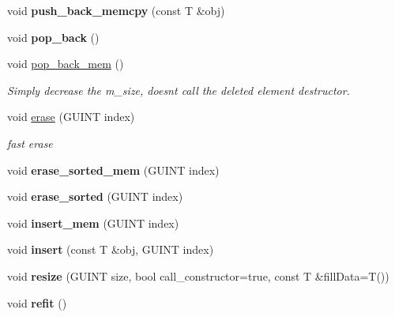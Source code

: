 \begin{DoxyCompactItemize}
\mbox{\label{classgim__array_a8ef553253e1a77ed4f3168ca2e4da225}} 
void {\bfseries push\+\_\+back\+\_\+memcpy} (const T \&obj)
\item 
\mbox{\label{classgim__array_aeebbf5deb27265451bf00db5ce57c5fc}} 
void {\bfseries pop\+\_\+back} ()
\item 
\mbox{\label{classgim__array_aa15906909f6f824e559864359096db63}} 
void \hyperlink{classgim__array_aa15906909f6f824e559864359096db63}{pop\+\_\+back\+\_\+mem} ()
\begin{DoxyCompactList}\small\item\em Simply decrease the m\+\_\+size, doesn\textquotesingle{}t call the deleted element destructor. \end{DoxyCompactList}\item 
\mbox{\label{classgim__array_a0de98d5b161c18568c7bc3a13e90df51}} 
void \hyperlink{classgim__array_a0de98d5b161c18568c7bc3a13e90df51}{erase} (G\+U\+I\+NT index)
\begin{DoxyCompactList}\small\item\em fast erase \end{DoxyCompactList}\item 
\mbox{\label{classgim__array_a878dddc1e188bfdbd738ec925f4386cf}} 
void {\bfseries erase\+\_\+sorted\+\_\+mem} (G\+U\+I\+NT index)
\item 
\mbox{\label{classgim__array_a992f8d76ef464690cd11a4ffc3d5ac2d}} 
void {\bfseries erase\+\_\+sorted} (G\+U\+I\+NT index)
\item 
\mbox{\label{classgim__array_ad136c0af14df7e2943e437be26edda29}} 
void {\bfseries insert\+\_\+mem} (G\+U\+I\+NT index)
\item 
\mbox{\label{classgim__array_aa1855162e3317aead1e20dfe895dfe5c}} 
void {\bfseries insert} (const T \&obj, G\+U\+I\+NT index)
\item 
\mbox{\label{classgim__array_aa4a78ae4cec9771904e3b461c494431a}} 
void {\bfseries resize} (G\+U\+I\+NT size, bool call\+\_\+constructor=true, const T \&fill\+Data=T())
\item 
\mbox{\label{classgim__array_adee8674335c3f49686fffe144cca6deb}} 
void {\bfseries refit} ()
\end{DoxyCompactItemize}

